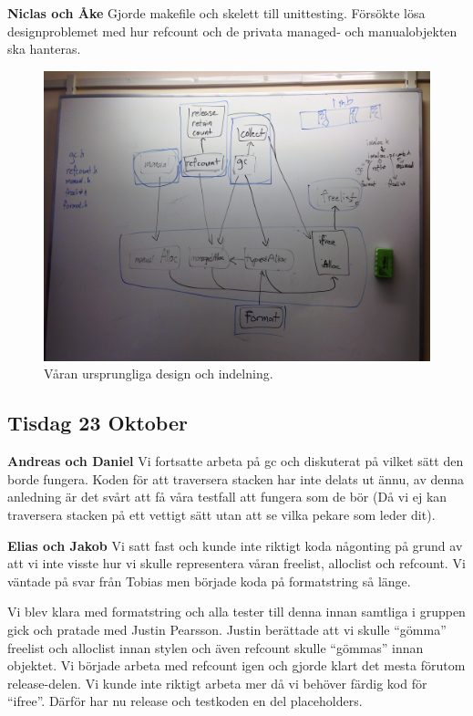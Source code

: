 \documentclass{article}
\begin{document}
{\bf Niclas och Åke} Gjorde makefile och skelett till unittesting. Försökte lösa designproblemet med hur refcount och de privata managed- och manualobjekten ska hanteras.


\begin{figure}[H]
  \includegraphics[width=\columnwidth]{images/design_whiteboard.jpg}
  \caption{Våran ursprungliga design och indelning.}
  \label{fig:design}
\end{figure}

\subsection{Tisdag 23 Oktober}

{\bf Andreas och Daniel} Vi fortsatte arbeta på gc och diskuterat på vilket sätt den borde fungera. Koden för att traversera stacken har inte delats ut ännu, av denna anledning är det svårt att få våra testfall att fungera som de bör (Då vi ej kan traversera stacken på ett vettigt sätt utan att se vilka pekare som leder dit).

{\bf Elias och Jakob} Vi satt fast och kunde inte riktigt koda någonting på grund av att vi inte visste hur vi skulle representera våran freelist, alloclist och refcount. Vi väntade på svar från Tobias men började koda på formatstring så länge.

Vi blev klara med formatstring och alla tester till denna innan samtliga i gruppen gick och pratade med Justin Pearsson. Justin berättade att vi skulle “gömma” freelist och alloclist innan stylen och även refcount skulle “gömmas” innan objektet. Vi började arbeta med refcount igen och gjorde klart det mesta förutom release-delen. Vi kunde inte riktigt arbeta mer då vi behöver färdig kod för “ifree”. Därför har nu release och testkoden en del placeholders.
\end{document}
